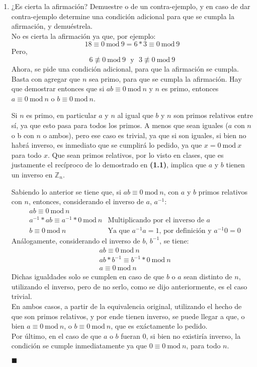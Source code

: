 \documentclass[letter]{article}
\begin{document}
	\begin{pregunta}{2}
		\begin{enumerate}
		\item ¿Es cierta la afirmación? Demuestre o de un contra-ejemplo, y en caso de dar contra-ejemplo determine una condición adicional para que se cumpla la afirmación, y demuéstrela.\\		
		No es cierta la afirmación ya que, por ejemplo:
		$$18 \equiv 0 \ \text{mod} \ 9 = 6*3 \equiv 0 \ \text{mod} \ 9$$
		Pero,
		$$6 \not\equiv 0 \ \text{mod} \ 9 \ \ \ \text{y} \ \ \ 3 \not\equiv 0 \ \text{mod} \ 9$$
		Ahora, se pide una condición adicional, para que la afirmación se cumpla. Basta con agregar que $n$ sea primo, para que 	se cumpla la afirmación. Hay que demostrar entonces que si $ab \equiv 0 \ \text{mod} \ n$	 y $n$ es primo, entonces $a \equiv 0 \ \text{mod} \ n$ o $b \equiv 0 \ \text{mod} \ n$.
		
		Si $n$ es primo, en particular $a$ y $n$ al igual que $b$ y $n$ son primos relativos entre sí, ya que esto pasa para todos los primos. A menos que sean iguales ($a$ con $n$ o b con $n$ o ambos), pero ese caso es trivial, ya que si son iguales, si bien no habrá inverso, es inmediato que se cumplirá lo pedido, ya que $x = 0 \ \text{mod} \ x$ para todo $x$. Que sean primos relativos, por lo visto en clases, que es justamente el recíproco de lo demostrado en \textbf{(1.1)}, implica que $a$ y $b$ tienen un inverso en $\mathbb{Z}_n$.
		
		Sabiendo lo anterior se tiene que, si $ab \equiv 0 \ \text{mod} \ n$, con $a$ y $b$ primos relativos con $n$, entonces, considerando el inverso de $a$, $a^{-1}$:
		\begin{align*}
			&ab \equiv 0 \ \text{mod} \ n &\\
			&a^{-1}*ab \equiv a^{-1}*0 \ \text{mod} \ n & \text{Multiplicando por el inverso de } a\\
			&b \equiv 0 \ \text{mod} \ n & \text{Ya que } a^{-1}a = 1 \text{, por definición y } a^{-1}0 = 0
		\end{align*}
		Análogamente, considerando el inverso de $b$, $b^{-1}$, se tiene:
		\begin{align*}
			&ab \equiv 0 \ \text{mod} \ n\\
			&ab*b^{-1} \equiv b^{-1}*0 \ \text{mod} \ n\\
			&a \equiv 0 \ \text{mod} \ n
		\end{align*}
		Dichas igualdades solo se cumplen en caso de que $b$ o $a$ sean distinto de $n$, utilizando el inverso, pero de no serlo, como se dijo anteriormente, es el caso trivial.\\
		En ambos casos, a partir de la equivalencia original, utilizando el hecho de que son primos relativos, y por ende tienen inverso, se puede llegar a que, o bien $a \equiv 0 \ \text{mod} \ n$, o $b \equiv 0 \ \text{mod} \ n$, que es exáctamente lo pedido.\\
		Por último, en el caso de que $a$ o $b$ fueran 0, si bien no existiría inverso, la condición se cumple inmediatamente ya que $0 \equiv 0 \ \text{mod} \ n $, para todo $n$.
		\begin{flushright}$\blacksquare$\end{flushright}


\end{enumerate}
\end{pregunta}
\end{document}
